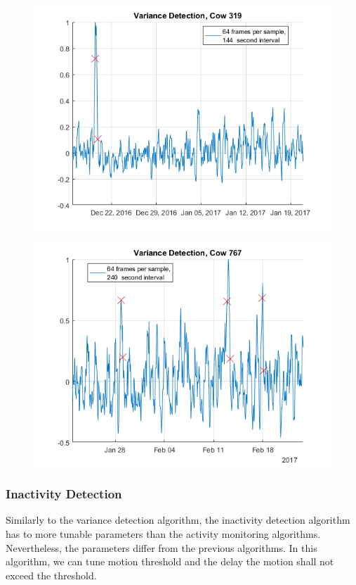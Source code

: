 \documentclass[english,12pt,a4paper,pdftex,elec,utf8]{aaltothesis}
\begin{document}
\begin{figure}[htb]
\centering
\includegraphics[width = 0.75 \textwidth]{figures/VarianceDetectionCow319_64frames144seconds.png}
\caption{}
\label{}
\end{figure}

\begin{figure}[htb]
\centering
\includegraphics[width = 0.75 \textwidth]{figures/VarianceDetectionCow767_64frames240seconds.png}
\caption{}
\label{}
\end{figure}





\subsubsection{Inactivity Detection} \label{inactivitydetectionevaluation}

Similarly to the variance detection algorithm, the inactivity detection algorithm has to more tunable parameters than the activity monitoring algorithms. Nevertheless, the parameters differ from the previous algorithms. In this algorithm, we can tune motion threshold and the delay the motion shall not exceed the threshold.
\end{document}
